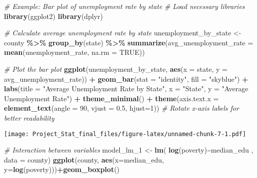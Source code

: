 \documentclass[
]{article}
\newenvironment{Shaded}{\begin{snugshade}}{\end{snugshade}}
\newcommand{\AttributeTok}[1]{\textcolor[rgb]{0.13,0.29,0.53}{#1}}
\newcommand{\CommentTok}[1]{\textcolor[rgb]{0.56,0.35,0.01}{\textit{#1}}}
\newcommand{\ConstantTok}[1]{\textcolor[rgb]{0.56,0.35,0.01}{#1}}
\newcommand{\DecValTok}[1]{\textcolor[rgb]{0.00,0.00,0.81}{#1}}
\newcommand{\FloatTok}[1]{\textcolor[rgb]{0.00,0.00,0.81}{#1}}
\newcommand{\FunctionTok}[1]{\textcolor[rgb]{0.13,0.29,0.53}{\textbf{#1}}}
\newcommand{\NormalTok}[1]{#1}
\newcommand{\OtherTok}[1]{\textcolor[rgb]{0.56,0.35,0.01}{#1}}
\newcommand{\SpecialCharTok}[1]{\textcolor[rgb]{0.81,0.36,0.00}{\textbf{#1}}}
\newcommand{\StringTok}[1]{\textcolor[rgb]{0.31,0.60,0.02}{#1}}
\begin{document}
\begin{Shaded}
\begin{Highlighting}[]
\CommentTok{\# Example: Bar plot of unemployment rate by state}
\CommentTok{\# Load necessary libraries}
\FunctionTok{library}\NormalTok{(ggplot2)}
\FunctionTok{library}\NormalTok{(dplyr)}

\CommentTok{\# Calculate average unemployment rate by state}
\NormalTok{unemployment\_by\_state }\OtherTok{\textless{}{-}}\NormalTok{ county }\SpecialCharTok{\%\textgreater{}\%} 
  \FunctionTok{group\_by}\NormalTok{(state) }\SpecialCharTok{\%\textgreater{}\%} 
  \FunctionTok{summarize}\NormalTok{(}\AttributeTok{avg\_unemployment\_rate =} \FunctionTok{mean}\NormalTok{(unemployment\_rate, }\AttributeTok{na.rm =} \ConstantTok{TRUE}\NormalTok{))}

\CommentTok{\# Plot the bar plot}
\FunctionTok{ggplot}\NormalTok{(unemployment\_by\_state, }\FunctionTok{aes}\NormalTok{(}\AttributeTok{x =}\NormalTok{ state, }\AttributeTok{y =}\NormalTok{ avg\_unemployment\_rate)) }\SpecialCharTok{+}
  \FunctionTok{geom\_bar}\NormalTok{(}\AttributeTok{stat =} \StringTok{"identity"}\NormalTok{, }\AttributeTok{fill =} \StringTok{"skyblue"}\NormalTok{) }\SpecialCharTok{+}
  \FunctionTok{labs}\NormalTok{(}\AttributeTok{title =} \StringTok{"Average Unemployment Rate by State"}\NormalTok{,}
       \AttributeTok{x =} \StringTok{"State"}\NormalTok{,}
       \AttributeTok{y =} \StringTok{"Average Unemployment Rate"}\NormalTok{) }\SpecialCharTok{+}
  \FunctionTok{theme\_minimal}\NormalTok{() }\SpecialCharTok{+}
  \FunctionTok{theme}\NormalTok{(}\AttributeTok{axis.text.x =} \FunctionTok{element\_text}\NormalTok{(}\AttributeTok{angle =} \DecValTok{90}\NormalTok{, }\AttributeTok{vjust =} \FloatTok{0.5}\NormalTok{, }\AttributeTok{hjust=}\DecValTok{1}\NormalTok{))  }\CommentTok{\# Rotate x{-}axis labels for better readability}
\end{Highlighting}
\end{Shaded}

\texttt{[image: Project\_Stat\_final\_files/figure-latex/unnamed-chunk-7-1.pdf]}

\begin{Shaded}
\begin{Highlighting}[]
\CommentTok{\# Interaction between variables}
\NormalTok{model\_lm\_1 }\OtherTok{\textless{}{-}} \FunctionTok{lm}\NormalTok{( }\FunctionTok{log}\NormalTok{(poverty)}\SpecialCharTok{\textasciitilde{}}\NormalTok{median\_edu , }\AttributeTok{data =}\NormalTok{ county)}
\FunctionTok{ggplot}\NormalTok{(county, }\FunctionTok{aes}\NormalTok{(}\AttributeTok{x=}\NormalTok{median\_edu, }\AttributeTok{y=}\FunctionTok{log}\NormalTok{(poverty)))}\SpecialCharTok{+}\FunctionTok{geom\_boxplot}\NormalTok{()}
\end{Highlighting}
\end{Shaded}
\end{document}

